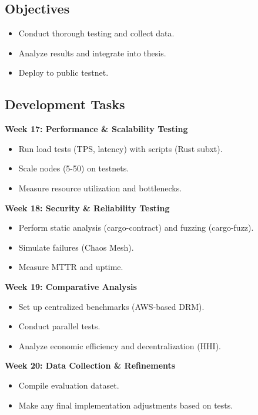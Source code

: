 \documentclass[12pt,a4paper]{article}
\begin{document}
\subsection*{Objectives}

\begin{itemize}
    \item Conduct thorough testing and collect data.
    \item Analyze results and integrate into thesis.
    \item Deploy to public testnet.
\end{itemize}

\subsection*{Development Tasks}

\textbf{Week 17: Performance \& Scalability Testing}
\begin{itemize}
    \item Run load tests (TPS, latency) with scripts (Rust subxt).
    \item Scale nodes (5-50) on testnets.
    \item Measure resource utilization and bottlenecks.
\end{itemize}

\textbf{Week 18: Security \& Reliability Testing}
\begin{itemize}
    \item Perform static analysis (cargo-contract) and fuzzing (cargo-fuzz).
    \item Simulate failures (Chaos Mesh).
    \item Measure MTTR and uptime.
\end{itemize}

\textbf{Week 19: Comparative Analysis}
\begin{itemize}
    \item Set up centralized benchmarks (AWS-based DRM).
    \item Conduct parallel tests.
    \item Analyze economic efficiency and decentralization (HHI).
\end{itemize}

\textbf{Week 20: Data Collection \& Refinements}
\begin{itemize}
    \item Compile evaluation dataset.
    \item Make any final implementation adjustments based on tests.
\end{itemize}
\end{document}
